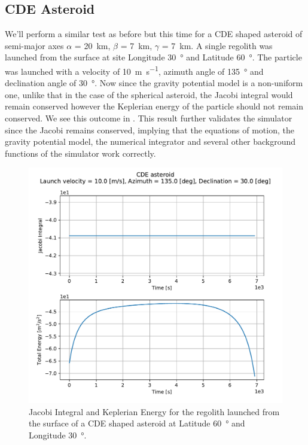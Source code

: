 \subsection{\gls{CDE} Asteroid}
\label{subsec:CDE_asteroid_orbital_mech_vv}
We'll perform a similar test as before but this time for a \gls{CDE} shaped asteroid of semi-major axes $\alpha$ = \SI{20}{\kilo \metre}, $\beta$ = \SI{7}{\kilo \metre}, $\gamma$ = \SI{7}{\kilo \metre}. A single regolith was launched from the surface at site Longitude \SI{30}{\degree} and Latitude \SI{60}{\degree}. The particle was launched with a velocity of \SI{10}{\metre \per \second}, azimuth angle of \SI{135}{\degree} and declination angle of \SI{30}{\degree}. Now since the gravity potential model is a non-uniform one, unlike that in the case of the spherical asteroid, the Jacobi integral would remain conserved however the Keplerian energy of the particle should not remain conserved. We see this outcome in . This result further validates the simulator since the Jacobi remains conserved, implying that the equations of motion, the gravity potential model, the numerical integrator and several other background functions of the simulator work correctly.
\begin{figure}[htb]
\centering
\captionsetup{justification=centering}
\includegraphics[width=\textwidth, height=0.5\textheight, keepaspectratio=true]{Images/cde_asteroid_long30_lat60_jacobi_energy.pdf}
\caption{Jacobi Integral and Keplerian Energy for the regolith launched from the surface of a \gls{CDE} shaped asteroid at Latitude \SI{60}{\degree} and Longitude \SI{30}{\degree}.}
\label{fig:cde_asteroid_jacobi_energy_vv}
\end{figure}
